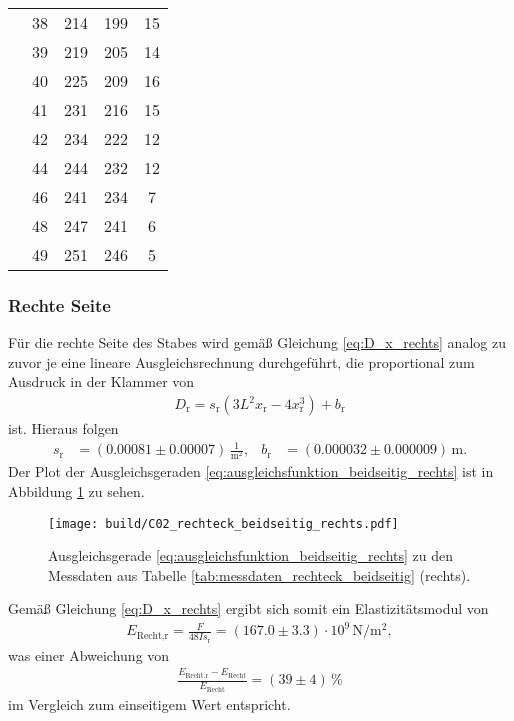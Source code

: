 \begin{table}[H]
\begin{tabular}[]{S S[table-format = 2.0] S S S[table-format = 2.0]}
                 & 38 & 214 & 199 & 15 \\
                 & 39 & 219 & 205 & 14 \\
                 & 40 & 225 & 209 & 16 \\
                 & 41 & 231 & 216 & 15 \\
                 & 42 & 234 & 222 & 12 \\
                 & 44 & 244 & 232 & 12 \\
                 & 46 & 241 & 234 &  7 \\
                 & 48 & 247 & 241 &  6 \\
                 & 49 & 251 & 246 &  5 \\
        \bottomrule
    \end{tabular}
\end{table}

\subsubsection{Rechte Seite}
Für die rechte Seite des Stabes wird gemäß Gleichung \eqref{eq:D_x_rechts} analog zu zuvor je eine lineare Ausgleichsrechnung durchgeführt,
die proportional zum Ausdruck in der Klammer von
\begin{align}
    D_\text{r} = s_\text{r} \left(3 L^2 x_\text{r} - 4 x_\text{r}^3\right) + b_\text{r}
    \label{eq:ausgleichsfunktion_beidseitig_rechts}
\end{align}
ist.
Hieraus folgen 
\begin{align*}
    s_\text{r} &= (\num{0.00081} \pm \num{0.00007}) \, \frac{1}{\unit{\meter^2}}, & 
    b_\text{r} &= (\num{0.000032} \pm \num{0.000009}) \, \unit{\meter}.
\end{align*}
Der Plot der Ausgleichsgeraden \eqref{eq:ausgleichsfunktion_beidseitig_rechts} ist in Abbildung \ref{fig:plot_rechteck_beidseitig_rechts}
zu sehen.
%
\begin{figure}[H]
    \centering
    \texttt{[image: build/C02\_rechteck\_beidseitig\_rechts.pdf]}
    \caption{Ausgleichsgerade \eqref{eq:ausgleichsfunktion_beidseitig_rechts} zu den Messdaten aus Tabelle \ref{tab:messdaten_rechteck_beidseitig} (rechts).}
    \label{fig:plot_rechteck_beidseitig_rechts}
\end{figure}

\noindent
Gemäß Gleichung \eqref{eq:D_x_rechts} ergibt sich somit ein Elastizitätsmodul von 
\begin{align}
    E_\text{Recht,r} = \frac{F}{48 I s_\text{r}} = (\num{167.0} \pm \num{3.3}) \cdot 10^9 \, \unit{\newton\per\meter^2},
\end{align}
was einer Abweichung von 
\begin{align*}
    \frac{E_\text{Recht,r} - E_\text{Recht}}{E_\text{Recht}} = (\num{39} \pm \num{4}) \, \%
\end{align*}
im Vergleich zum einseitigem Wert entspricht.





